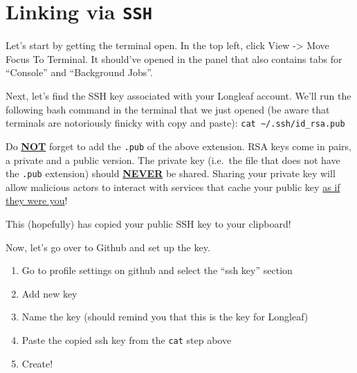 \documentclass[
  letterpaper,
  DIV=11,
  numbers=noendperiod]{scrreprt}
\begin{document}
\hypertarget{linking-via-ssh}{%
\section{\texorpdfstring{Linking via
\texttt{SSH}}{Linking via SSH}}\label{linking-via-ssh}}

Let's start by getting the terminal open. In the top left, click View
-\textgreater{} Move Focus To Terminal. It should've opened in the panel
that also contains tabs for ``Console'' and ``Background Jobs''.

Next, let's find the SSH key associated with your Longleaf account.
We'll run the following bash command in the terminal that we just opened
(be aware that terminals are notoriously finicky with copy and paste):
\texttt{cat\ \textasciitilde{}/.ssh/id\_rsa.pub}

\begin{tcolorbox}[enhanced jigsaw, left=2mm, colframe=quarto-callout-caution-color-frame, leftrule=.75mm, opacitybacktitle=0.6, toptitle=1mm, title=\textcolor{quarto-callout-caution-color}{\faFire}\hspace{0.5em}{Danger}, opacityback=0, coltitle=black, colbacktitle=quarto-callout-caution-color!10!white, breakable, colback=white, titlerule=0mm, bottomrule=.15mm, arc=.35mm, bottomtitle=1mm, rightrule=.15mm, toprule=.15mm]

Do \uline{\textbf{NOT}} forget to add the \texttt{.pub} of the above
extension. RSA keys come in pairs, a private and a public version. The
private key (i.e.~the file that does not have the \texttt{.pub}
extension) should \uline{\textbf{NEVER}} be shared. Sharing your private
key will allow malicious actors to interact with services that cache
your public key \uline{as if they were you}!

\end{tcolorbox}

This (hopefully) has copied your public SSH key to your clipboard!

Now, let's go over to Github and set up the key.

\begin{enumerate}
\def\labelenumi{\arabic{enumi}.}
\item
  Go to profile settings on github and select the ``ssh key'' section
\item
  Add new key
\item
  Name the key (should remind you that this is the key for Longleaf)
\item
  Paste the copied ssh key from the \texttt{cat} step above
\item
  Create!
\end{enumerate}
\end{document}
